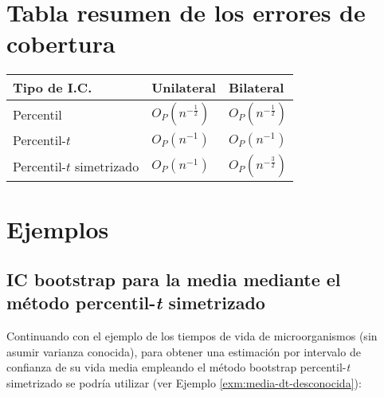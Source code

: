 \documentclass[]{book}
\theoremstyle{break}
\theoremstyle{definition}
\theoremstyle{definition}
\theoremstyle{definition}
\theoremstyle{remark}
\begin{document}
\section{Tabla resumen de los errores de cobertura}\label{cap-err-cober}

\begin{longtable}[]{@{}lll@{}}
\toprule
Tipo de I.C. & Unilateral & Bilateral\tabularnewline
\midrule
\endhead
Percentil & \(O_{P}\left( n^{-\frac{1}{2}}\right)\) &
\(O_{P}\left(n^{-\frac{1}{2}} \right)\)\tabularnewline
Percentil-\(t\) & \(O_{P}\left( n^{-1} \right)\) &
\(O_{P}\left( n^{-1} \right)\)\tabularnewline
Percentil-\(t\) simetrizado & \(O_{P}\left( n^{-1} \right)\) &
\(O_{P}\left( n^{-\frac{3}{2}} \right)\)\tabularnewline
\bottomrule
\end{longtable}

\section{Ejemplos}\label{icboot-ejem}

\subsection{\texorpdfstring{IC bootstrap para la media mediante el
método percentil-\emph{t}
simetrizado}{IC bootstrap para la media mediante el método percentil-t simetrizado}}\label{media-dt-desconocida-persim}

Continuando con el ejemplo de los tiempos de vida de microorganismos
(sin asumir varianza conocida), para obtener una estimación por
intervalo de confianza de su vida media empleando el método bootstrap
percentil-\emph{t} simetrizado se podría utilizar (ver Ejemplo
\ref{exm:media-dt-desconocida}):
\end{document}
